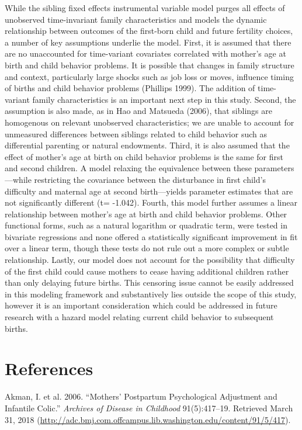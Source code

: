 \documentclass[]{article}
\begin{document}
While the sibling fixed effects instrumental variable model purges all
effects of unobserved time-invariant family characteristics and models
the dynamic relationship between outcomes of the first-born child and
future fertility choices, a number of key assumptions underlie the
model. First, it is assumed that there are no unaccounted for
time-variant covariates correlated with mother's age at birth and child
behavior problems. It is possible that changes in family structure and
context, particularly large shocks such as job loss or moves, influence
timing of births and child behavior problems (Phillips 1999). The
addition of time-variant family characteristics is an important next
step in this study. Second, the assumption is also made, as in Hao and
Matsueda (2006), that siblings are homogenous on relevant unobserved
characteristics; we are unable to account for unmeasured differences
between siblings related to child behavior such as differential
parenting or natural endowments. Third, it is also assumed that the
effect of mother's age at birth on child behavior problems is the same
for first and second children. A model relaxing the equivalence between
these parameters---while restricting the covariance between the
disturbance in first child's difficulty and maternal age at second
birth---yields parameter estimates that are not significantly different
(t= -1.042). Fourth, this model further assumes a linear relationship
between mother's age at birth and child behavior problems. Other
functional forms, such as a natural logarithm or quadratic term, were
tested in bivariate regressions and none offered a statistically
significant improvement in fit over a linear term, though these tests do
not rule out a more complex or subtle relationship. Lastly, our model
does not account for the possibility that difficulty of the first child
could cause mothers to cease having additional children rather than only
delaying future births. This censoring issue cannot be easily addressed
in this modeling framework and substantively lies outside the scope of
this study, however it is an important consideration which could be
addressed in future research with a hazard model relating current child
behavior to subsequent births.

\section{References}\label{references}

\hypertarget{refs}{}
\hypertarget{ref-akman_mothers_2006}{}
Akman, I. et al. 2006. ``Mothers' Postpartum Psychological Adjustment
and Infantile Colic.'' \emph{Archives of Disease in Childhood}
91(5):417--19. Retrieved March 31, 2018
(\url{http://adc.bmj.com.offcampus.lib.washington.edu/content/91/5/417}).
\end{document}
